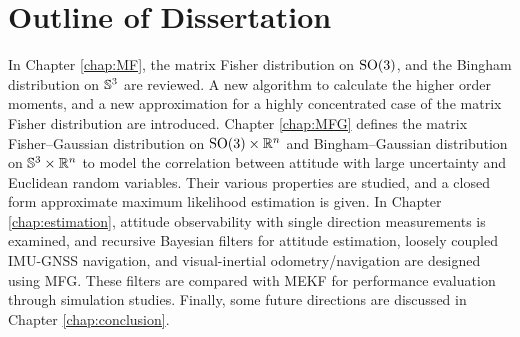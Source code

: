 \section{Outline of Dissertation}

In Chapter \ref{chap:MF}, the matrix Fisher distribution on $\mathrm{SO}(3)$, and the Bingham distribution on $\mathbb{S}^3$ are reviewed.
A new algorithm to calculate the higher order moments, and a new approximation for a highly concentrated case of the matrix Fisher distribution are introduced.
Chapter \ref{chap:MFG} defines the matrix Fisher--Gaussian distribution on $\mathrm{SO}(3) \times \mathbb{R}^n$ and Bingham--Gaussian distribution on $\mathbb{S}^3\times\mathbb{R}^n$ to model the correlation between attitude with large uncertainty and Euclidean random variables.
Their various properties are studied, and a closed form approximate maximum likelihood estimation is given.
In Chapter \ref{chap:estimation}, attitude observability with single direction measurements is examined, and recursive Bayesian filters for attitude estimation, loosely coupled IMU-GNSS navigation, and visual-inertial odometry/navigation are designed using MFG.
These filters are compared with MEKF for performance evaluation through simulation studies.
Finally, some future directions are discussed in Chapter \ref{chap:conclusion}.

